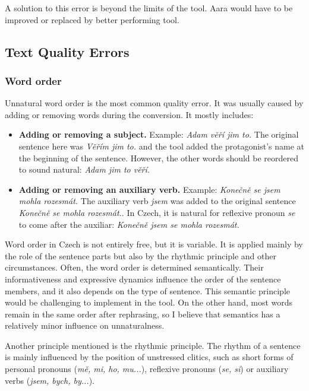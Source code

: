 A solution to this error is beyond the limits of the tool. Aara would have to be improved or replaced by better performing tool.

\subsection{Text Quality Errors}

\subsubsection{Word order}

Unnatural word order is the most common quality error. It was usually caused by adding or removing words during the conversion. It mostly includes:

\begin{itemize}
	\item \textbf{Adding or removing a subject.} Example: \emph{Adam věří jim to.} The original sentence here was \emph{Věřím jim to.} and the tool added the protagonist's name at the beginning of the sentence. However, the other words should be reordered to sound natural: \emph{Adam jim to věří.}
	\item \textbf{Adding or removing an auxiliary verb.} Example: \emph{Konečně se jsem mohla rozesmát.} The auxiliary verb \emph{jsem} was added to the original sentence \emph{Konečně se mohla rozesmát.}. In Czech, it is natural for reflexive pronoun \emph{se} to come after the auxiliar: \emph{Konečně jsem se mohla rozesmát.}
\end{itemize}

Word order in Czech is not entirely free, but it is variable. It is applied mainly by the role of the sentence parts but also by the rhythmic principle and other circumstances. Often, the word order is determined semantically. Their informativeness and expressive dynamics influence the order of the sentence members, and it also depends on the type of sentence. \cite{vlasin-slovnik} This semantic principle would be challenging to implement in the tool. On the other hand, most words remain in the same order after rephrasing, so I believe that semantics has a relatively minor influence on unnaturalness.

Another principle mentioned is the rhythmic principle. The rhythm of a sentence is mainly influenced by the position of unstressed clitics, such as short forms of personal pronouns (\emph{mě, mi, ho, mu...}), reflexive pronouns (\emph{se, si}) or auxiliary verbs (\emph{jsem, bych, by...}). \cite{vlasin-slovnik}

